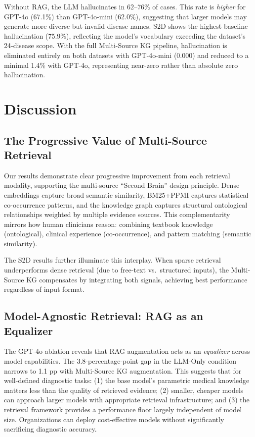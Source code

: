 \documentclass[preprint,12pt]{elsarticle}
\begin{document}
Without RAG, the LLM hallucinates in 62--76\% of cases. This rate is \emph{higher} for GPT-4o (67.1\%) than GPT-4o-mini (62.0\%), suggesting that larger models may generate more diverse but invalid disease names. S2D shows the highest baseline hallucination (75.9\%), reflecting the model's vocabulary exceeding the dataset's 24-disease scope. With the full Multi-Source KG pipeline, hallucination is eliminated entirely on both datasets with GPT-4o-mini (0.000) and reduced to a minimal 1.4\% with GPT-4o, representing near-zero rather than absolute zero hallucination.

\section{Discussion}
\label{sec:discussion}

\subsection{The Progressive Value of Multi-Source Retrieval}

Our results demonstrate clear progressive improvement from each retrieval modality, supporting the multi-source ``Second Brain'' design principle. Dense embeddings capture broad semantic similarity, BM25+PPMI captures statistical co-occurrence patterns, and the knowledge graph captures structural ontological relationships weighted by multiple evidence sources. This complementarity mirrors how human clinicians reason: combining textbook knowledge (ontological), clinical experience (co-occurrence), and pattern matching (semantic similarity).

The S2D results further illuminate this interplay. When sparse retrieval underperforms dense retrieval (due to free-text vs.\ structured inputs), the Multi-Source KG compensates by integrating both signals, achieving best performance regardless of input format.

\subsection{Model-Agnostic Retrieval: RAG as an Equalizer}

The GPT-4o ablation reveals that RAG augmentation acts as an \emph{equalizer} across model capabilities. The 3.8-percentage-point gap in the LLM-Only condition narrows to 1.1 pp with Multi-Source KG augmentation. This suggests that for well-defined diagnostic tasks: (1) the base model's parametric medical knowledge matters less than the quality of retrieved evidence; (2) smaller, cheaper models can approach larger models with appropriate retrieval infrastructure; and (3) the retrieval framework provides a performance floor largely independent of model size. Organizations can deploy cost-effective models without significantly sacrificing diagnostic accuracy.
\end{document}
